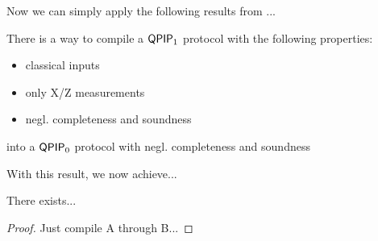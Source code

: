 Now we can simply apply the following results from ...

\begin{thm}
	There is a way to compile a $\operatorname{\mathsf{QPIP}}_1$ protocol with the following properties:
	\begin{itemize}
		\item classical inputs
		\item only X/Z measurements
		\item negl. completeness and soundness
	\end{itemize}
	into a $\operatorname{\mathsf{QPIP}}_0$ protocol with negl. completeness and soundness
\end{thm}

With this result, we now achieve...
\begin{thm}
	There exists...
\end{thm}
\begin{proof}
	Just compile A through B...
\end{proof}

